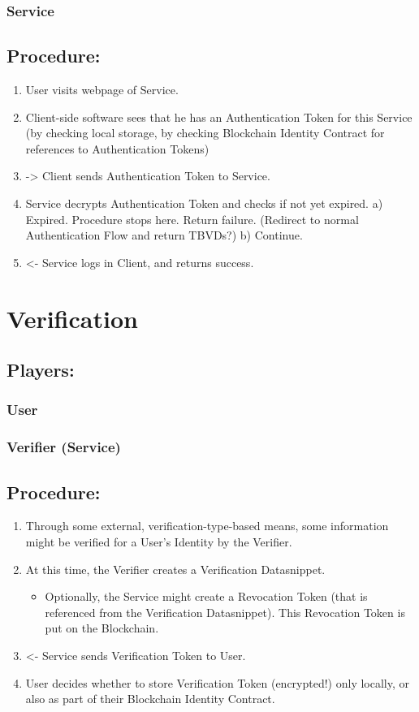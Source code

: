 \documentclass[11pt]{article}
\begin{document}
\subsubsection{Service}
\label{sec:org087ce32}
\subsection{Procedure:}
\label{sec:orge2a6785}
\begin{enumerate}
\item User visits webpage of Service.
\item Client-side software sees that he has an Authentication Token for this Service (by checking local storage, by checking Blockchain Identity Contract for references to Authentication Tokens)
\item -> Client sends Authentication Token to Service.
\item Service decrypts Authentication Token and checks if not yet expired.
a) Expired. Procedure stops here. Return failure. (Redirect to normal Authentication Flow and return TBVDs?)
b) Continue.
\item <- Service logs in Client, and returns success.
\end{enumerate}

\section{Verification}
\label{sec:orgd03a8eb}
\subsection{Players:}
\label{sec:orgd801fac}
\subsubsection{User}
\label{sec:orga609c0b}
\subsubsection{Verifier (Service)}
\label{sec:org9ae8d88}
\subsection{Procedure:}
\label{sec:org54e5d3a}
\begin{enumerate}
\item Through some external, verification-type-based means, some information might be verified for a User's Identity by the Verifier.
\item At this time, the Verifier creates a Verification Datasnippet.
\begin{itemize}
\item Optionally, the Service might create a Revocation Token (that is referenced from the Verification Datasnippet). This Revocation Token is put on the Blockchain.
\end{itemize}
\item <- Service sends Verification Token to User.
\item User decides whether to store Verification Token (encrypted!) only locally, or also as part of their Blockchain Identity Contract.
\end{enumerate}
\end{document}
